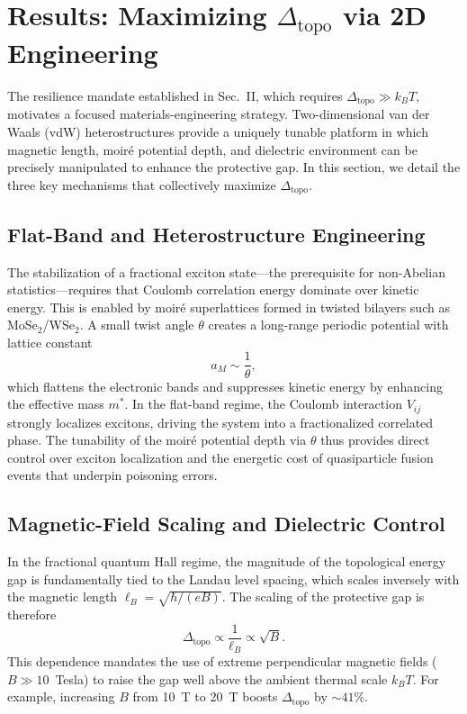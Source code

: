 \documentclass[aps,prl,twocolumn,superscriptaddress]{revtex4-2}
\begin{document}
\section{Results: Maximizing $\Delta_{\text{topo}}$ via 2D Engineering}

The resilience mandate established in Sec.~II, which requires $\Delta_{\text{topo}} \gg k_B T$, motivates a focused materials-engineering strategy. Two-dimensional van der Waals (vdW) heterostructures provide a uniquely tunable platform in which magnetic length, moiré potential depth, and dielectric environment can be precisely manipulated to enhance the protective gap. In this section, we detail the three key mechanisms that collectively maximize $\Delta_{\text{topo}}$.

\subsection{Flat-Band and Heterostructure Engineering}
The stabilization of a fractional exciton state---the prerequisite for non-Abelian statistics---requires that Coulomb correlation energy dominate over kinetic energy. This is enabled by moiré superlattices formed in twisted bilayers such as MoSe$_2$/WSe$_2$. A small twist angle $\theta$ creates a long-range periodic potential with lattice constant
\begin{equation}
a_M \sim \frac{1}{\theta},
\end{equation}
which flattens the electronic bands and suppresses kinetic energy by enhancing the effective mass $m^{*}$. In the flat-band regime, the Coulomb interaction $V_{ij}$ strongly localizes excitons, driving the system into a fractionalized correlated phase. The tunability of the moiré potential depth via $\theta$ thus provides direct control over exciton localization and the energetic cost of quasiparticle fusion events that underpin poisoning errors.

\subsection{Magnetic-Field Scaling and Dielectric Control}
In the fractional quantum Hall regime, the magnitude of the topological energy gap is fundamentally tied to the Landau level spacing, which scales inversely with the magnetic length $\ell_B = \sqrt{\hbar / (eB)}$. The scaling of the protective gap is therefore
\begin{equation}
\Delta_{\text{topo}} \propto \frac{1}{\ell_B} \propto \sqrt{B}.
\end{equation}
This dependence mandates the use of extreme perpendicular magnetic fields ($B \gg 10$~Tesla) to raise the gap well above the ambient thermal scale $k_B T$. For example, increasing $B$ from 10~T to 20~T boosts $\Delta_{\text{topo}}$ by $\sim 41\%$. 
\end{document}
